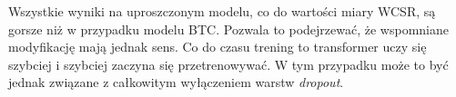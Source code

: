 Wszystkie wyniki na uproszczonym modelu, co do wartości miary WCSR, są gorsze niż w przypadku modelu BTC. Pozwala to podejrzewać, że wspomniane modyfikację mają jednak sens. Co do czasu trening to transformer uczy się szybciej i szybciej zaczyna się przetrenowywać. W tym przypadku może to być jednak związane z całkowitym wyłączeniem warstw \emph{dropout}.

